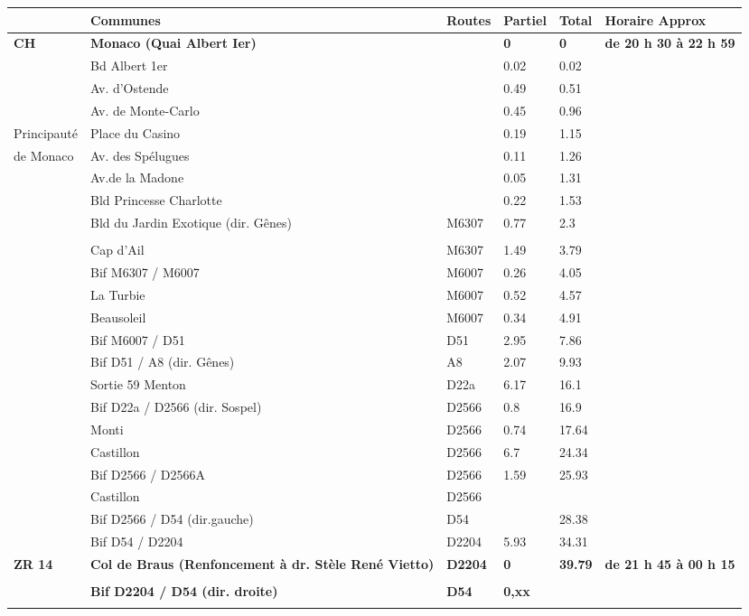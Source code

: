 \documentclass{article}%
\begin{document}
\begin{longtable}{p{2.25cm}|p{7.0cm}|p{1.5cm}|p{1.5cm}|p{1.5cm}|p{3.5cm}}%
\hline%
&Communes&Routes&Partiel&Total&Horaire Approx\\%
\hline%
\endhead%
\endfoot%
\endlastfoot%
\textbf{﻿CH}&\textbf{Monaco  (Quai Albert Ier)}& &\textbf{0}&\textbf{0}&\textbf{de 20 h 30 à 22 h 59}\\%
 &Bd Albert 1er& &0.02&0.02& \\%
 &Av. d'Ostende& &0.49&0.51& \\%
 &Av. de Monte-Carlo& &0.45&0.96& \\%
Principauté&Place du Casino& &0.19&1.15& \\%
de Monaco&Av. des Spélugues& &0.11&1.26& \\%
 &Av.de la Madone& &0.05&1.31& \\%
 &Bld Princesse Charlotte& &0.22&1.53& \\%
 &Bld du Jardin Exotique (dir. Gênes)&M6307&0.77&2.3& \\%
 & & & & & \\%
 &Cap d'Ail &M6307&1.49&3.79& \\%
 &Bif M6307 / M6007&M6007&0.26&4.05& \\%
 &La Turbie&M6007&0.52&4.57& \\%
 &Beausoleil&M6007&0.34&4.91& \\%
 &Bif M6007 / D51&D51&2.95&7.86& \\%
 &Bif D51 / A8 (dir. Gênes)&A8&2.07&9.93& \\%
 &Sortie 59 Menton &D22a&6.17&16.1& \\%
 &Bif D22a / D2566  (dir. Sospel)&D2566&0.8&16.9& \\%
 &Monti&D2566&0.74&17.64& \\%
 &Castillon&D2566&6.7&24.34& \\%
 &Bif D2566 / D2566A&D2566&1.59&25.93& \\%
 &Castillon&D2566& & & \\%
 &Bif D2566 / D54 (dir.gauche)&D54& &28.38& \\%
 &Bif D54 / D2204&D2204&5.93&34.31& \\%
\textbf{ZR 14    }&\textbf{Col de Braus (Renfoncement à dr. Stèle René Vietto)   }&\textbf{D2204}&\textbf{0}&\textbf{39.79}&\textbf{de 21 h 45 à 00 h 15}\\%
 & & & & & \\%
 &\textbf{Bif D2204 / D54 (dir. droite)}&\textbf{D54}&\textbf{0,xx}& & \\%
 & & & & & \\%

\end{longtable}
\end{document}

